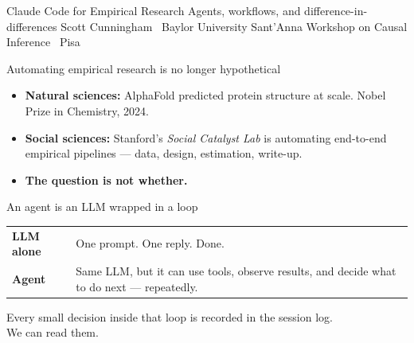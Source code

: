 \documentclass[aspectratio=169,11pt]{beamer}
\begin{document}
\codechellatitle
  {Claude Code for Empirical Research}
  {Agents, workflows, and difference-in-differences}
  {Scott Cunningham \textperiodcentered\ Baylor University}
  {Sant'Anna Workshop on Causal Inference \textperiodcentered\ Pisa}


\begin{frame}{Automating empirical research is no longer hypothetical}
\vspace{0.4em}
\begin{itemize}\setlength\itemsep{0.6em}
  \item \textbf{Natural sciences:} AlphaFold predicted protein structure at scale. Nobel Prize in Chemistry, 2024.
  \item \textbf{Social sciences:} Stanford's \textit{Social Catalyst Lab} is automating end-to-end empirical pipelines --- data, design, estimation, write-up.
  \item \textbf{The question is not whether.} 
\end{itemize}
\end{frame}

\begin{frame}{An agent is an LLM wrapped in a loop}
\vspace{0.6em}
\begin{center}
\begin{tabular}{lp{8cm}}
  \textbf{LLM alone} & One prompt. One reply. Done. \\[0.6em]
  \textbf{Agent}     & Same LLM, but it can use tools, observe results, and decide what to do next --- repeatedly. \\
\end{tabular}
\end{center}
\vspace{0.6em}
\begin{center}
\color{warmgray}\small
Every small decision inside that loop is recorded in the session log.\\
We can read them.
\end{center}
\end{frame}
\end{document}
